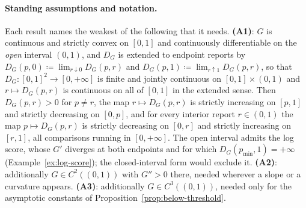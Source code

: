 \documentclass[acmsmall,nonacm,screen]{acmart}
\theoremstyle{acmplain}%
\theoremstyle{acmdefinition}%
\numberwithin{equation}{section}
\begin{document}
\paragraph{Standing assumptions and notation.}
Each result names the weakest of the following that it needs. \textbf{(A1)}: $G$ is continuous and strictly convex on $[0,1]$ and continuously differentiable on the \emph{open} interval $(0,1)$, and $D_G$ is extended to endpoint reports by $D_G(p,0) \coloneqq \lim_{r \downarrow 0} D_G(p,r)$ and $D_G(p,1) \coloneqq \lim_{r \uparrow 1} D_G(p,r)$, so that $D_G : [0,1]^2 \to [0,+\infty]$ is finite and jointly continuous on $[0,1] \times (0,1)$ and $r \mapsto D_G(p,r)$ is continuous on all of $[0,1]$ in the extended sense. Then $D_G(p,r) > 0$ for $p \ne r$, the map $r \mapsto D_G(p,r)$ is strictly increasing on $[p,1]$ and strictly decreasing on $[0,p]$, and for every interior report $r \in (0,1)$ the map $p \mapsto D_G(p,r)$ is strictly decreasing on $[0,r]$ and strictly increasing on $[r,1]$, all comparisons running in $[0,+\infty]$. The open interval admits the log score, whose $G'$ diverges at both endpoints and for which $D_G(p_{\min},1) = +\infty$ (Example~\ref{ex:log-score}); the closed-interval form would exclude it. \textbf{(A2)}: additionally $G \in C^2((0,1))$ with $G'' > 0$ there, needed wherever a slope or a curvature appears. \textbf{(A3)}: additionally $G \in C^3((0,1))$, needed only for the asymptotic constants of Proposition~\ref{prop:below-threshold}.
\end{document}
